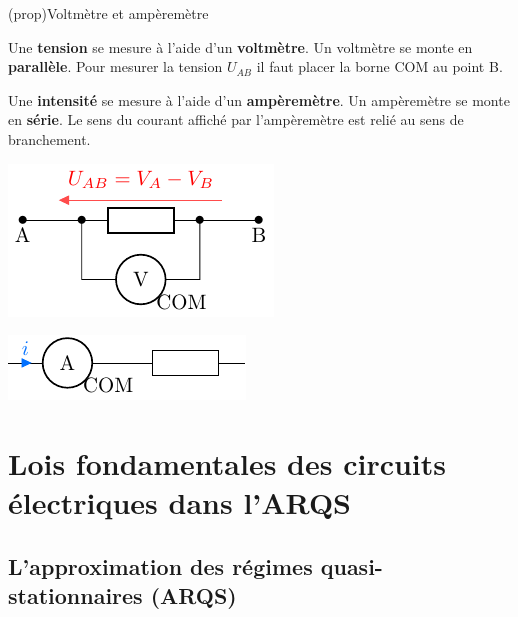 \documentclass[../../main/main.tex]{subfiles}
\begin{document}
\begin{tcb}[label=prop:mesure, sidebyside, righthand ratio=.4](prop){Voltmètre et ampèremètre}

	Une \textbf{tension} se mesure à l'aide d'un \textbf{voltmètre}.
	\smallbreak
	Un voltmètre se monte en \textbf{parallèle}.
	\smallbreak
	Pour mesurer la tension $U_{AB}$ il faut placer la borne COM au point B.

	\bigbreak

	Une \textbf{intensité} se mesure à l'aide d'un \textbf{ampèremètre}.
	\smallbreak
	Un ampèremètre se monte en \textbf{série}.
	\smallbreak
	Le sens du courant affiché par l'ampèremètre est relié au sens de branchement.

	\tcblower
	\begin{center}
		\includegraphics[width=\linewidth]{voltmetre}
	\end{center}
	\begin{center}
		\includegraphics[width=\linewidth]{amperemetre}
	\end{center}
\end{tcb}

\section{Lois fondamentales des circuits électriques dans l'ARQS}

\subsection{L'approximation des régimes quasi-stationnaires (ARQS)}
\end{document}
